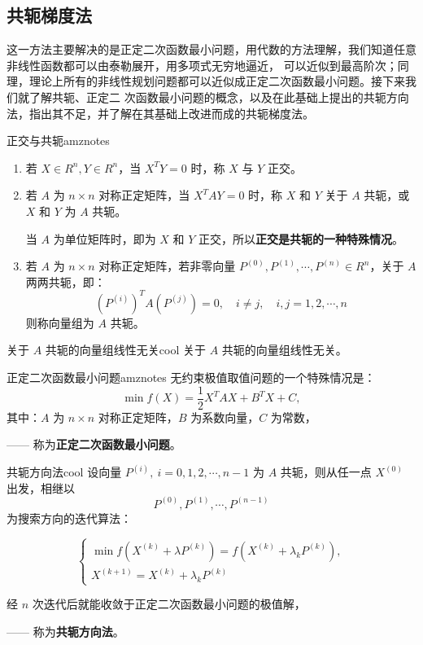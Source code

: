 \subsection{共轭梯度法}
这一方法主要解决的是正定二次函数最小问题，用代数的方法理解，我们知道任意非线性函数都可以由泰勒展开，用多项式无穷地逼近，
可以近似到最高阶次；同理，理论上所有的非线性规划问题都可以近似成正定二次函数最小问题。接下来我们就了解共轭、正定二
次函数最小问题的概念，以及在此基础上提出的共轭方向法，指出其不足，并了解在其基础上改进而成的共轭梯度法。\\
\begin{dfnbox}{正交与共轭}{amznotes}
    \begin{enumerate}
        \item 若 $X \in R^n, Y \in R^n$，当 $X^T Y = 0$ 时，称 $X$ 与 $Y$ 正交。
        
        \item 若 $A$ 为 $n \times n$ 对称正定矩阵，当 $X^T A Y = 0$ 时，称 $X$ 和 $Y$ 关于 $A$ 共轭，或 $X$ 和 $Y$ 为 $A$ 共轭。
        
        当 $A$ 为单位矩阵时，即为 $X$ 和 $Y$ 正交，所以\textbf{正交是共轭的一种特殊情况}。
        
        \item 若 $A$ 为 $n \times n$ 对称正定矩阵，若非零向量 $P^{(0)}, P^{(1)}, \cdots, P^{(n)} \in R^n$，关于 $A$ 两两共轭，即：
        \[
        (P^{(i)})^T A (P^{(j)}) = 0, \quad i \neq j, \quad i, j = 1, 2, \cdots, n
        \]
        则称向量组为 $A$ 共轭。
    \end{enumerate}
\end{dfnbox}
\begin{thmbox}{关于 $A$ 共轭的向量组线性无关}{cool}
    关于 $A$ 共轭的向量组线性无关。
\end{thmbox}
\begin{dfnbox}{正定二次函数最小问题}{amznotes}
    无约束极值取值问题的一个特殊情况是：
    \[
    \min f(X) = \frac{1}{2} X^T A X + B^T X + C,
    \]
    其中：$A$ 为 $n \times n$ 对称正定矩阵，$B$ 为系数向量，$C$ 为常数，

    \noindent —— 称为\textbf{正定二次函数最小问题}。
\end{dfnbox}
\begin{thmbox}{共轭方向法}{cool}
    设向量 $P^{(i)}, \ i=0,1,2,\cdots,n-1$ 为 $A$ 共轭，则从任一点 $X^{(0)}$ 出发，相继以
    \[
    P^{(0)}, P^{(1)}, \cdots, P^{(n-1)}
    \]
    为搜索方向的迭代算法：

    \[
    \begin{cases}
        \min f(X^{(k)} + \lambda P^{(k)}) = f(X^{(k)} + \lambda_k P^{(k)}), \\
        X^{(k+1)} = X^{(k)} + \lambda_k P^{(k)}
    \end{cases}
    \]

    经 $n$ 次迭代后就能收敛于正定二次函数最小问题的极值解，

    \noindent —— 称为\textbf{共轭方向法}。
\end{thmbox}
